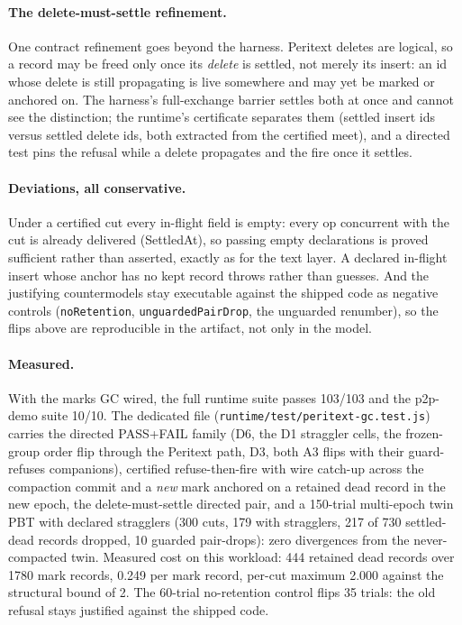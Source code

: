 \documentclass[11pt]{article}
\newcommand{\code}[1]{\texttt{#1}}
\begin{document}
\paragraph{The delete-must-settle refinement.} One contract refinement
goes beyond the harness. Peritext deletes are logical, so a record may
be freed only once its \emph{delete} is settled, not merely its
insert: an id whose delete is still propagating is live somewhere and
may yet be marked or anchored on. The harness's full-exchange barrier
settles both at once and cannot see the distinction; the runtime's
certificate separates them (settled insert ids versus settled delete
ids, both extracted from the certified meet), and a directed test pins
the refusal while a delete propagates and the fire once it settles.

\paragraph{Deviations, all conservative.} Under a certified cut every
in-flight field is empty: every op concurrent with the cut is already
delivered (SettledAt), so passing empty declarations is proved
sufficient rather than asserted, exactly as for the text layer. A
declared in-flight insert whose anchor has no kept record throws
rather than guesses. And the justifying countermodels stay executable
against the shipped code as negative controls (\code{noRetention},
\code{unguardedPairDrop}, the unguarded renumber), so the flips above
are reproducible in the artifact, not only in the model.

\paragraph{Measured.} With the marks GC wired, the full runtime suite
passes 103/103 and the p2p-demo suite 10/10. The dedicated file
(\code{runtime/test/peritext-gc.test.js}) carries the directed
PASS+FAIL family (D6, the D1 straggler cells, the frozen-group order
flip through the Peritext path, D3, both A3 flips with their
guard-refuses companions), certified refuse-then-fire with wire
catch-up across the compaction commit and a \emph{new} mark anchored
on a retained dead record in the new epoch, the delete-must-settle
directed pair, and a 150-trial multi-epoch twin PBT with declared
stragglers (300 cuts, 179 with stragglers, 217 of 730 settled-dead
records dropped, 10 guarded pair-drops): zero divergences from the
never-compacted twin. Measured cost on this workload: 444 retained
dead records over 1780 mark records, 0.249 per mark record, per-cut
maximum 2.000 against the structural bound of 2. The 60-trial
no-retention control flips 35 trials: the old refusal stays justified
against the shipped code.
\end{document}
